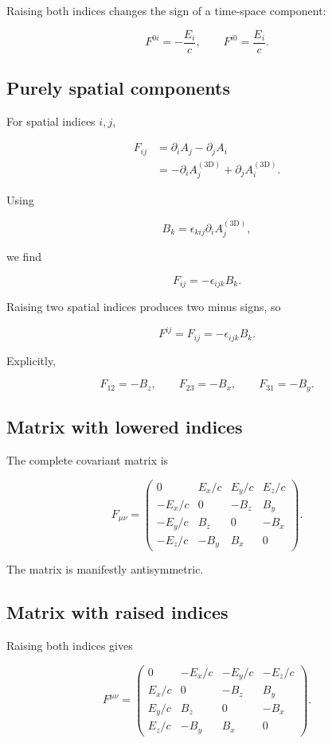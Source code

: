 Raising both indices changes the sign of a time-space component:

\[
\boxed{
F^{0i}
=
-
\frac{E_i}{c}
},
\qquad
\boxed{
F^{i0}
=
\frac{E_i}{c}
}.
\]

\subsection{Purely spatial components}

For spatial indices \(i,j\),

\[
\begin{aligned}
F_{ij}
&=
\partial_iA_j
-
\partial_jA_i\\
&=
-
\partial_iA_j^{\mathrm{(3D)}}
+
\partial_jA_i^{\mathrm{(3D)}}.
\end{aligned}
\]

Using

\[
B_k
=
\epsilon_{kij}
\partial_iA_j^{\mathrm{(3D)}},
\]

we find

\[
\boxed{
F_{ij}
=
-\epsilon_{ijk}B_k
}.
\]

Raising two spatial indices produces two minus signs, so

\[
\boxed{
F^{ij}=F_{ij}
=
-\epsilon_{ijk}B_k
}.
\]

Explicitly,

\[
F_{12}=-B_z,
\qquad
F_{23}=-B_x,
\qquad
F_{31}=-B_y.
\]

\subsection{Matrix with lowered indices}

The complete covariant matrix is

\[
\boxed{
F_{\mu\nu}
=
\begin{pmatrix}
0 & E_x/c & E_y/c & E_z/c\\
-E_x/c & 0 & -B_z & B_y\\
-E_y/c & B_z & 0 & -B_x\\
-E_z/c & -B_y & B_x & 0
\end{pmatrix}
}.
\]

The matrix is manifestly antisymmetric.

\subsection{Matrix with raised indices}

Raising both indices gives

\[
\boxed{
F^{\mu\nu}
=
\begin{pmatrix}
0 & -E_x/c & -E_y/c & -E_z/c\\
E_x/c & 0 & -B_z & B_y\\
E_y/c & B_z & 0 & -B_x\\
E_z/c & -B_y & B_x & 0
\end{pmatrix}
}.
\]


